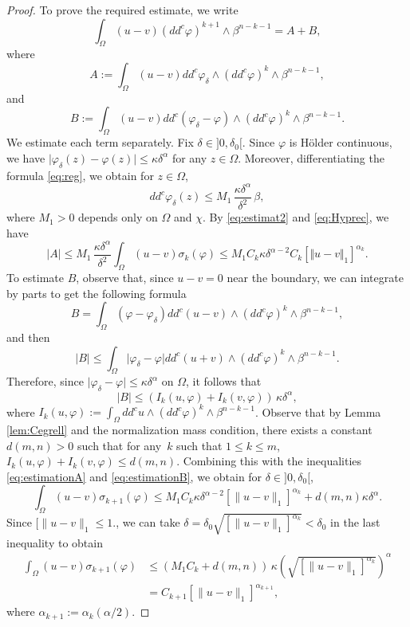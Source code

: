 \documentclass[11pt]{article}
\numberwithin{equation}{section}
\theoremstyle{definition}
\theoremstyle{plain}
\theoremstyle{definition}
\begin{document}
\begin{proof}
To prove the required estimate, we write
\[
\int_{\Omega}(u-v) (dd^c\varphi)^{k+1} \wedge\beta^{n-k-1} = A + B,
\]
where
\[
A:=\int_{\Omega}(u-v)dd^c \varphi_{\delta}\wedge(dd^c\varphi)^k\wedge\beta^{n-k-1},
\]
and
\[
B := \int_{\Omega}(u-v) dd^c(\varphi_{\delta}-\varphi)\wedge(dd^c\varphi)^k\wedge\beta^{n-k-1}.
\]
We estimate each term separately.
Fix $\delta\in{}]0,\delta_0[$. Since $\varphi$ is Hölder continuous, we have $\vert \varphi_{\delta} (z) - \varphi (z)\vert \leq \kappa \delta^{\alpha}$ for any $z \in \Omega$. Moreover, differentiating the formula \eqref{eq:reg}, we obtain for $z \in \Omega$,
\begin{equation} \label{eq:estimat2}
dd^c \varphi_{\delta} (z) \leq M_1\, \frac{ \kappa \delta^{\alpha}}{\delta^2}\, \beta,
\end{equation}
where $M_1 > 0$ depends only on $\Omega$ and $\chi$. By \eqref{eq:estimat2} and \eqref{eq:Hyprec}, we have
\begin{equation} \label{eq:estimationA}
|A|\leq M_1\, \frac{\kappa \delta^{\alpha}}{\delta^2} \int_{\Omega}(u-v) \sigma_{k}(\varphi)
\leq M_1 C_k \kappa \delta^{\alpha - 2} C_{k} \left[\Vert u-v \Vert_1\right]^{\alpha_k}.
\end{equation}
To estimate $B$, observe that, since $ u - v = 0$ near the boundary, we can integrate by parts to get the following formula
\[
B = \int_{\Omega} (\varphi-\varphi_{\delta}) dd^c (u-v) \wedge(dd^c\varphi)^k\wedge\beta^{n-k-1},
\]
and then
\[
\vert B\vert \leq \int_{\Omega} \vert \varphi_{\delta}-\varphi\vert dd^c (u+v) \wedge(dd^c\varphi)^k\wedge\beta^{n-k-1}.
\]
Therefore, since $\vert \varphi_{\delta}-\varphi \vert \leq \kappa \delta^{\alpha}$ on $\Omega$, it follows that
\begin{equation} \label{eq:estimationB}
|B| \leq( I_k(u,\varphi) + I_k(v,\varphi) ) \, \kappa \delta^{\alpha},
\end{equation}
where $I_k (u,\varphi):= \int_{\Omega} dd^c u \wedge(dd^c\varphi)^k\wedge\beta^{n-k-1}$. Observe that by Lemma \ref{lem:Cegrell} and the normalization mass condition, there exists a constant $d(m,n) > 0$ such that for any~$k$ such that $1 \leq k \leq m$, $I_k(u,\varphi) + I_k(v,\varphi) \leq d (m,n)$. Combining this with the inequalities \eqref{eq:estimationA} and \eqref{eq:estimationB}, we obtain for $\delta\in{}]0,\delta_0[$,
\[
\int_{\Omega}(u-v) \sigma_{k +1}(\varphi)\leq M_1 C_k \kappa \delta^{\alpha- 2} [\|u-v\|_1]^{\alpha_k}+ d(m,n) \kappa \delta^{\alpha}.
\]
Since $ [\|u-v\|_1 \leq 1$., we can take $\delta= \delta_0 \sqrt{ [\|u-v\|_1]^{\alpha_k}} < \delta_0$ in the last inequality to obtain
\begin{align*}
\int_{\Omega}(u-v) \sigma_{k+1}(\varphi) &\leq (M_1 C_k + d (m,n))\, \kappa \left(\sqrt{ [\|u-v\|_1]^{\alpha_k}}\right)^{\alpha} \\
& = C_{k + 1} [\|u-v\|_1]^{\alpha_{k+ 1}},
\end{align*}
where $\alpha_{k + 1}:= \alpha_k (\alpha \slash 2)$.
\end{proof}
\end{document}
